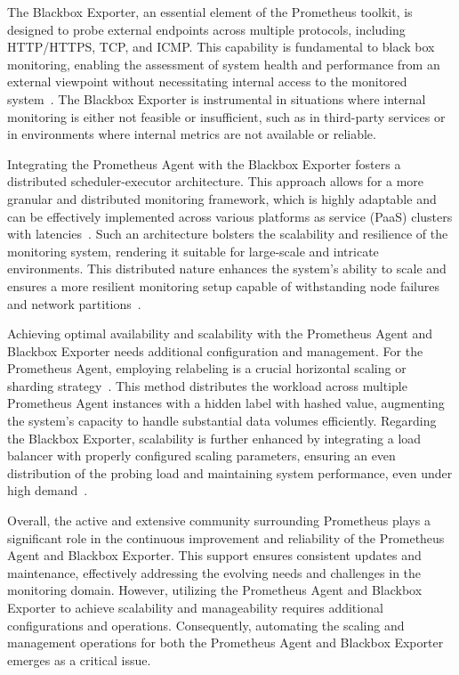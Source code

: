 The Blackbox Exporter, an essential element of the Prometheus toolkit, is designed to probe external endpoints across multiple protocols, including HTTP/HTTPS, TCP, and ICMP. This capability is fundamental to black box monitoring, enabling the assessment of system health and performance from an external viewpoint without necessitating internal access to the monitored system~\parencite{prometheusBlackboxExporter2023}. The Blackbox Exporter is instrumental in situations where internal monitoring is either not feasible or insufficient, such as in third-party services or in environments where internal metrics are not available or reliable.

Integrating the Prometheus Agent with the Blackbox Exporter fosters a distributed scheduler-executor architecture. This approach allows for a more granular and distributed monitoring framework, which is highly adaptable and can be effectively implemented across various platforms as service (PaaS) clusters with latencies~\parencite{prometheusUnderstandingUsingMultitarget}. Such an architecture bolsters the scalability and resilience of the monitoring system, rendering it suitable for large-scale and intricate environments. This distributed nature enhances the system's ability to scale and ensures a more resilient monitoring setup capable of withstanding node failures and network partitions~\parencite{prometheusIntroducingPrometheusAgent}.

Achieving optimal availability and scalability with the Prometheus Agent and Blackbox Exporter needs additional configuration and management. For the Prometheus Agent, employing relabeling is a crucial horizontal scaling or sharding strategy~\parencite{prometheusHowRelabelingPrometheus}. This method distributes the workload across multiple Prometheus Agent instances with a hidden label with hashed value, augmenting the system's capacity to handle substantial data volumes efficiently. Regarding the Blackbox Exporter, scalability is further enhanced by integrating a load balancer with properly configured scaling parameters, ensuring an even distribution of the probing load and maintaining system performance, even under high demand~\parencite{prometheusIntroducingPrometheusAgent}.

Overall, the active and extensive community surrounding Prometheus plays a significant role in the continuous improvement and reliability of the Prometheus Agent and Blackbox Exporter. This support ensures consistent updates and maintenance, effectively addressing the evolving needs and challenges in the monitoring domain. However, utilizing the Prometheus Agent and Blackbox Exporter to achieve scalability and manageability requires additional configurations and operations. Consequently, automating the scaling and management operations for both the Prometheus Agent and Blackbox Exporter emerges as a critical issue.

